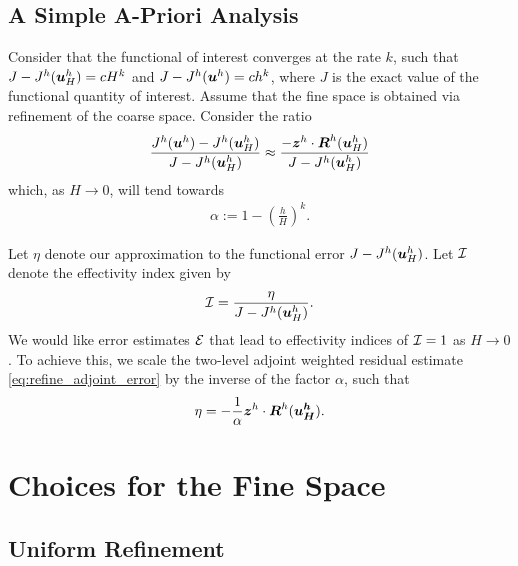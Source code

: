 \subsection{A Simple A-Priori Analysis}

Consider that the functional of interest
converges at the rate $k$, such that
$J - J^h(\boldsymbol{u}^h_H) = c H^k$ and
$J - J^h(\boldsymbol{u}^h) = c h^k$,
where $J$ is the exact value of the functional
quantity of interest. Assume that the fine space
is obtained via refinement of the coarse space.
Consider the ratio
%
\begin{gather}
\frac{J^h(\boldsymbol{u}^h) - J^h(\boldsymbol{u}^h_H)}
{J - J^h(\boldsymbol{u}^h_H)} \approx
\frac{ - \boldsymbol{z}^h \cdot \boldsymbol{R}^h(\boldsymbol{u}^h_H)}
{J - J^h(\boldsymbol{u}^h_H)}
\end{gather}
%
which, as $H \to 0$, will tend towards \cite{fidkowski2011review}
%
\begin{gather}
\alpha := 1 - \left( \frac{h}{H} \right)^k.
\label{eq:refine_alpha}
\end{gather}
%

Let $\eta$ denote our approximation to the
functional error $J - J^h(\boldsymbol{u}^h_H)$.
Let $\mathcal{I}$ denote the effectivity index
given by
%
\begin{gather}
\mathcal{I} = \frac{\eta}{J - J^h(\boldsymbol{u}^h_H)}.
\label{eq:refine_effectivity}
\end{gather}
%
We would like error estimates
$\mathcal{E}$ that lead to effectivity indices of
$\mathcal{I} = 1$ as $H \to 0$. To achieve this, we scale
the two-level adjoint weighted residual estimate
\eqref{eq:refine_adjoint_error} by the inverse
of the factor $\alpha$, such that
%
\begin{gather}
\eta = - \frac{1}{\alpha}
\boldsymbol{z}^h \cdot \boldsymbol{R}^h(\boldsymbol{u^h_H}).
\label{eq:refine_error_approx}
\end{gather}

\section{Choices for the Fine Space}

\subsection{Uniform Refinement}

